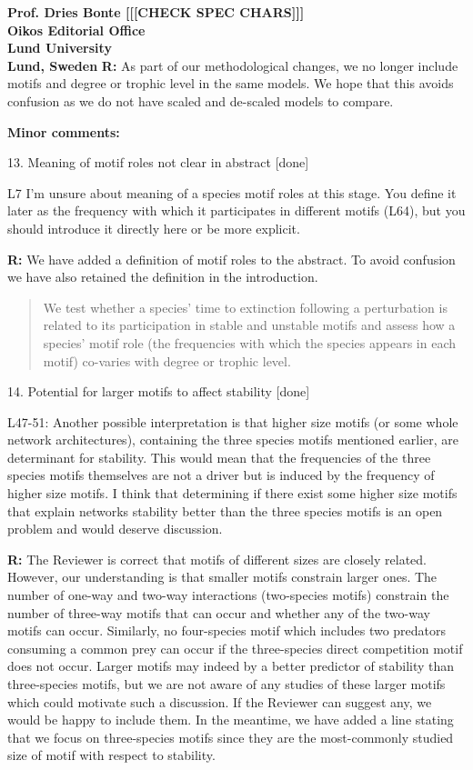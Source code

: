 \documentclass[12pt]{letter}
\begin{document}
\begin{letter}{\bf Prof. Dries Bonte [[[CHECK SPEC CHARS]]]\\
Oikos Editorial Office \\
Lund University \\
Lund, Sweden}
        \textbf{R:} As part of our methodological changes, we no longer include motifs and degree or trophic level in the same models. We hope that this avoids confusion as we do not have scaled and de-scaled models to compare.


  \textbf{Minor comments:}

    13. Meaning of motif roles not clear in abstract [done]

      L7  I’m unsure about meaning of a species motif roles at this stage. You define it later as the frequency with which it participates in different motifs (L64), but you should introduce it directly here or be more explicit.

      \textbf{R:} We have added a definition of motif roles to the abstract. To avoid confusion we have also retained the definition in the introduction.

      \begin{quotation}
       We test whether a species' time to extinction following a perturbation is related to its participation in stable and unstable motifs and assess how a species' motif role (the frequencies with which the species appears in each motif) co-varies with degree or trophic level.
      \end{quotation}


    14. Potential for larger motifs to affect stability [done]

        L47-51: Another possible interpretation is that higher size motifs (or some whole network architectures), containing the three species motifs mentioned earlier, are determinant for stability. This would mean that the frequencies of the three species motifs themselves are not a driver but is induced by the frequency of higher size motifs. I think that determining if there exist some higher size motifs that explain networks stability better than the three species motifs is an open problem and would deserve discussion.
        
        \textbf{R:} The Reviewer is correct that motifs of different sizes are closely related. However, our understanding is that smaller motifs constrain larger ones. The number of one-way and two-way interactions (two-species motifs) constrain the number of three-way motifs that can occur and whether any of the two-way motifs can occur. Similarly, no four-species motif which includes two predators consuming a common prey can occur if the three-species direct competition motif does not occur. Larger motifs may indeed by a better predictor of stability than three-species motifs, but we are not aware of any studies of these larger motifs which could motivate such a discussion. If the Reviewer can suggest any, we would be happy to include them. In the meantime, we have added a line stating that we focus on three-species motifs since they are the most-commonly studied size of motif with respect to stability.
        

\end{letter}
\end{document}
